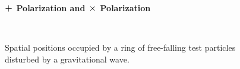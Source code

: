 \begin{figure}[H]
\centering
    \textbf{$\mathlarger{\mathlarger{+}}$ Polarization and $\mathlarger{\mathlarger{\times}}$ Polarization}\par\medskip
\centering
{} \quad
{} \\
\caption{Spatial positions occupied by a ring of free-falling test particles disturbed by a gravitational wave.}
\label{plus_and_times}
\end{figure}
